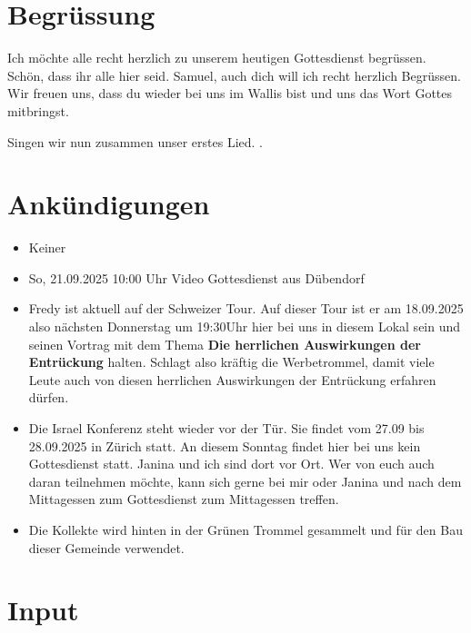 \documentclass{mybib}
\begin{document}
\section{Begrüssung}
Ich möchte alle recht herzlich zu unserem heutigen Gottesdienst begrüssen. Schön, dass ihr alle hier seid. Samuel, auch dich will ich recht herzlich Begrüssen. Wir freuen uns, dass du wieder bei uns im Wallis bist und uns das Wort Gottes mitbringst. 

\beten{}

Singen wir nun zusammen unser erstes Lied.
{}.

\section{Ankündigungen}
\begin{itemize}
    \item {} Keiner
    \item {} So, 21.09.2025 10:00 Uhr Video Gottesdienst aus Dübendorf
    \item {} Fredy ist aktuell auf der Schweizer Tour. Auf dieser Tour ist er am 18.09.2025 also nächsten Donnerstag um 19:30Uhr hier bei uns in diesem Lokal sein und seinen Vortrag mit dem Thema \textbf{Die herrlichen Auswirkungen der Entrückung} halten. Schlagt also kräftig die Werbetrommel, damit viele Leute auch von diesen herrlichen Auswirkungen der Entrückung erfahren dürfen.
    \item {} Die Israel Konferenz steht wieder vor der Tür. Sie findet vom 27.09 bis 28.09.2025 in Zürich statt. An diesem Sonntag findet hier bei uns kein Gottesdienst statt. Janina und ich sind dort vor Ort. Wer von euch auch daran teilnehmen möchte, kann sich gerne bei mir oder Janina und nach dem Mittagessen zum Gottesdienst zum Mittagessen treffen.
    \item Die Kollekte wird hinten in der Grünen Trommel gesammelt und für den Bau dieser Gemeinde verwendet.
\end{itemize}

\section{ Input }




\end{document}
